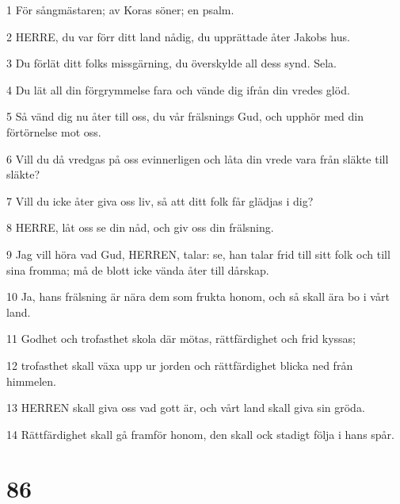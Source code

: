 \par 1 För sångmästaren; av Koras söner; en psalm.
\par 2 HERRE, du var förr ditt land nådig, du upprättade åter Jakobs hus.
\par 3 Du förlät ditt folks missgärning, du överskylde all dess synd. Sela.
\par 4 Du lät all din förgrymmelse fara och vände dig ifrån din vredes glöd.
\par 5 Så vänd dig nu åter till oss, du vår frälsnings Gud, och upphör med din förtörnelse mot oss.
\par 6 Vill du då vredgas på oss evinnerligen och låta din vrede vara från släkte till släkte?
\par 7 Vill du icke åter giva oss liv, så att ditt folk får glädjas i dig?
\par 8 HERRE, låt oss se din nåd, och giv oss din frälsning.
\par 9 Jag vill höra vad Gud, HERREN, talar: se, han talar frid till sitt folk och till sina fromma; må de blott icke vända åter till dårskap.
\par 10 Ja, hans frälsning är nära dem som frukta honom, och så skall ära bo i vårt land.
\par 11 Godhet och trofasthet skola där mötas, rättfärdighet och frid kyssas;
\par 12 trofasthet skall växa upp ur jorden och rättfärdighet blicka ned från himmelen.
\par 13 HERREN skall giva oss vad gott är, och vårt land skall giva sin gröda.
\par 14 Rättfärdighet skall gå framför honom, den skall ock stadigt följa i hans spår.

\chapter{86}

